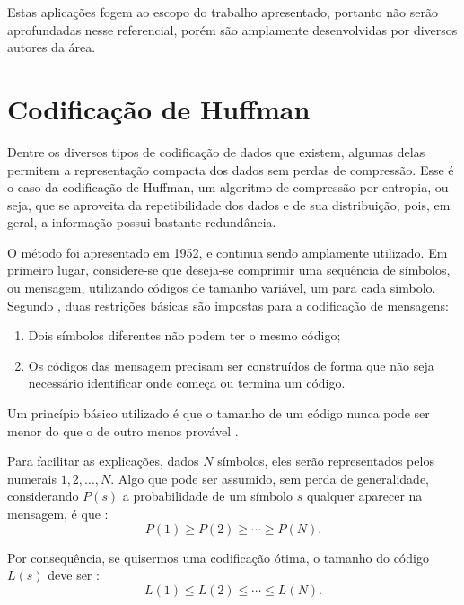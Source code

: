 \documentclass[cic,tc]{iiufrgs}
\begin{document}
Estas aplicações fogem ao escopo do trabalho apresentado, portanto não serão
aprofundadas nesse referencial, porém são amplamente desenvolvidas por diversos
autores da área.


\section{Codificação de Huffman}
Dentre os diversos tipos de codificação de dados que existem, algumas delas 
permitem a representação compacta dos dados sem perdas de compressão.
Esse é o caso da codificação de Huffman, um algoritmo de compressão por entropia,
ou seja, que se aproveita da repetibilidade dos dados e de sua distribuição, 
pois, em geral, a informação possui bastante redundância.

O método foi apresentado em 1952, e continua sendo amplamente utilizado. 
Em primeiro lugar, considere-se que deseja-se comprimir uma sequência de 
símbolos, ou mensagem, utilizando códigos de tamanho variável, um para cada símbolo.
Segundo \citet{HuffmanCoding}, duas restrições básicas são impostas para 
a codificação de mensagens:
\begin{enumerate}
    \item Dois símbolos diferentes não podem ter o mesmo código;
    \item Os códigos das mensagem precisam ser construídos de forma que não seja necessário 
    identificar onde começa ou termina um código.
\end{enumerate}

Um princípio básico utilizado é que o tamanho de um código nunca pode ser menor 
do que o de outro menos provável \cite{HuffmanCoding}.

Para facilitar as explicações, dados $N$ símbolos, eles serão representados 
pelos numerais $1, 2, ..., N$.
Algo que pode ser assumido, sem perda de generalidade, considerando $P(s)$ a probabilidade de um símbolo
$s$ qualquer aparecer na mensagem, é que \cite{HuffmanCoding}:
\begin{equation}
    \label{eq:hufprob}
    P(1) \ge P(2) \ge \cdots \ge P(N).
\end{equation}

Por consequência, se quisermos uma codificação ótima, o tamanho do código $L(s)$ 
deve ser \cite{HuffmanCoding}:
\begin{equation}
    \label{eq:huflen}
    L(1) \le L(2) \le \cdots \le L(N).
\end{equation}
\end{document}
